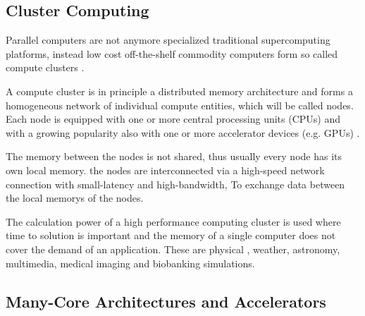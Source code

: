 \paragraph*{}



\subsection{Cluster Computing}
\label{sec:cluster}
Parallel computers are not anymore specialized traditional
supercomputing platforms, instead low cost off-the-shelf commodity
computers form so called compute clusters \cite{ref:hpcc1}.

A compute cluster is in principle a distributed memory architecture
and forms a homogeneous network of individual compute entities, which
will be called nodes. Each node is equipped with one or more central
processing units (CPUs) and with a growing popularity also with one or
more accelerator devices (e.g. GPUs) \cite{ref:accel}.

The memory between the nodes is not shared, thus usually every node
has its own local memory.  the nodes are interconnected via a
high-speed network connection with small-latency and high-bandwidth,
To exchange data between the local memorys of the nodes.

The calculation power of a high performance computing cluster
is used where time to solution is important and the memory
of a single computer does not cover the demand of an application. These are
physical \cite{ref:picongpu}, weather, astronomy,
multimedia, medical imaging and biobanking simulations.


\subsection{Many-Core Architectures and Accelerators}
\label{sec:accel}

